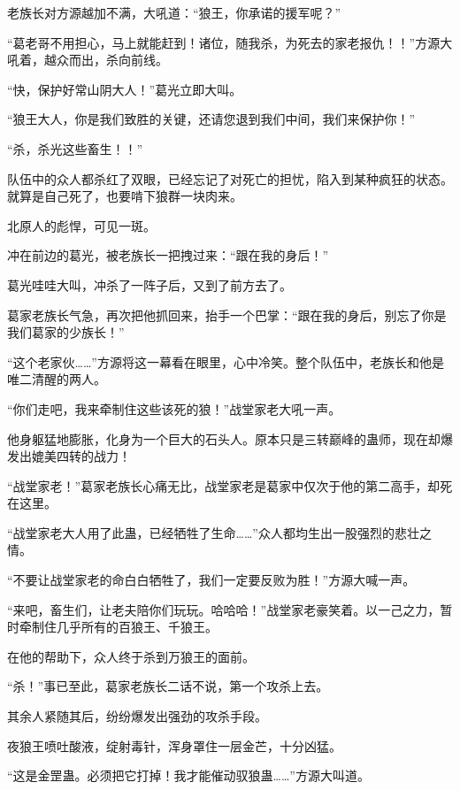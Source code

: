 
\begin{this_body}



老族长对方源越加不满，大吼道：“狼王，你承诺的援军呢？”

“葛老哥不用担心，马上就能赶到！诸位，随我杀，为死去的家老报仇！！”方源大吼着，越众而出，杀向前线。

“快，保护好常山阴大人！”葛光立即大叫。

“狼王大人，你是我们致胜的关键，还请您退到我们中间，我们来保护你！”

“杀，杀光这些畜生！！”

队伍中的众人都杀红了双眼，已经忘记了对死亡的担忧，陷入到某种疯狂的状态。就算是自己死了，也要啃下狼群一块肉来。

北原人的彪悍，可见一斑。

冲在前边的葛光，被老族长一把拽过来：“跟在我的身后！”

葛光哇哇大叫，冲杀了一阵子后，又到了前方去了。

葛家老族长气急，再次把他抓回来，抬手一个巴掌：“跟在我的身后，别忘了你是我们葛家的少族长！”

“这个老家伙……”方源将这一幕看在眼里，心中冷笑。整个队伍中，老族长和他是唯二清醒的两人。

“你们走吧，我来牵制住这些该死的狼！”战堂家老大吼一声。

他身躯猛地膨胀，化身为一个巨大的石头人。原本只是三转巅峰的蛊师，现在却爆发出媲美四转的战力！

“战堂家老！”葛家老族长心痛无比，战堂家老是葛家中仅次于他的第二高手，却死在这里。

“战堂家老大人用了此蛊，已经牺牲了生命……”众人都均生出一股强烈的悲壮之情。

“不要让战堂家老的命白白牺牲了，我们一定要反败为胜！”方源大喊一声。

“来吧，畜生们，让老夫陪你们玩玩。哈哈哈！”战堂家老豪笑着。以一己之力，暂时牵制住几乎所有的百狼王、千狼王。

在他的帮助下，众人终于杀到万狼王的面前。

“杀！”事已至此，葛家老族长二话不说，第一个攻杀上去。

其余人紧随其后，纷纷爆发出强劲的攻杀手段。

夜狼王喷吐酸液，绽射毒针，浑身罩住一层金芒，十分凶猛。

“这是金罡蛊。必须把它打掉！我才能催动驭狼蛊……”方源大叫道。


\end{this_body}
